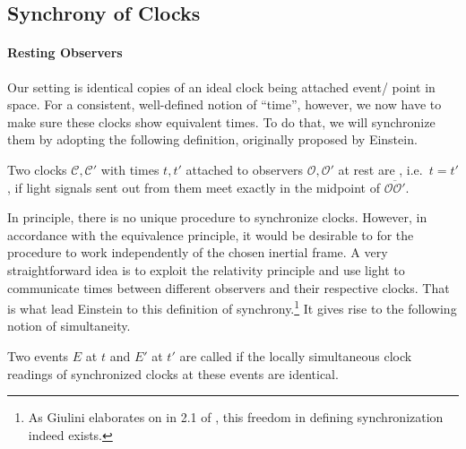 		\subsection{Synchrony of Clocks}
			\paragraph{Resting Observers}
Our setting is identical copies of an ideal clock being attached event/ point in space. For a consistent, well-defined notion of \enquote{time}, however, we now have to make sure these clocks show equivalent times. To do that, we will synchronize them by adopting the following definition, originally proposed by Einstein.

\begin{defi}\label{defi:einstein_synchrony}
Two clocks $\mathcal{C}, \mathcal{C}'$ with times $t, t'$ attached to observers $\mathcal{O}, \mathcal{O}'$ at rest are , i.e.~$t = t'$, if light signals sent out from them meet exactly in the midpoint of $\overline{\mathcal{O} \mathcal{O}'}$.
\end{defi}
In principle, there is no unique procedure to synchronize clocks. However, in accordance with the equivalence principle, it would be desirable to for the procedure to work independently of the chosen inertial frame. A very straightforward idea is to exploit the relativity principle and use light to communicate times between different observers and their respective clocks. That is what lead Einstein to this definition of synchrony.\footnote{As Giulini elaborates on in 2.1 of \cite{giulini_srt}, this freedom in defining synchronization indeed exists.} It gives rise to the following notion of simultaneity.
\begin{defi}[Simultaneity]\label{defi:simultaneity}
Two events $E$ at $t$ and $E'$ at $t'$ are called  if the locally simultaneous clock readings of synchronized clocks at these events are identical.%
\end{defi}

